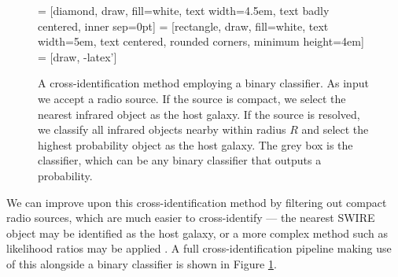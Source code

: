 \documentclass[fleqn,usenatbib,usedcolumn]{mnras}
\begin{document}
    \begin{figure}
      \centering
       = [diamond, draw, fill=white,
          text width=4.5em, text badly centered, inner sep=0pt]
       = [rectangle, draw, fill=white,
          text width=5em, text centered, rounded corners, minimum height=4em]
       = [draw, -latex']
      \caption{A cross-identification method employing a binary classifier. As
        input we accept a radio source. If the source is compact, we select
        the nearest infrared object as the host galaxy. If the source is
        resolved, we classify all infrared objects nearby within radius $R$
        and select the highest probability object as the host galaxy. The grey
        box is the classifier, which can be any binary classifier that outputs
        a probability.}
      \label{fig:flowchart}
    \end{figure}

    We can improve upon this cross-identification method by filtering out
    compact radio sources, which are much easier to cross-identify --- the
    nearest SWIRE object may be identified as the host galaxy, or a more
    complex method such as likelihood ratios may be applied
    \citep[see][]{weston17}. A full cross-identification pipeline making use
    of this alongside a binary classifier is shown in Figure
    \ref{fig:flowchart}.
\end{document}
